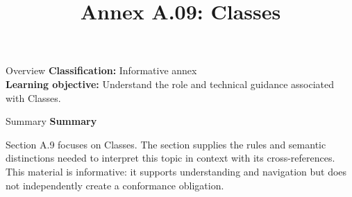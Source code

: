 \documentclass[10pt,letterpaper]{article}
\title{Annex A.09: Classes}
\author{}
\date{}
\begin{document}
\maketitle
\begin{CornellOverviewBox}{Overview}
\textbf{Classification:} Informative annex\\[2pt]
\textbf{Learning objective:} Understand the role and technical guidance associated with Classes.
\end{CornellOverviewBox}\begin{CornellSummaryBox}{Summary}
{\sffamily\bfseries\color{Accent} Summary}\par\vspace{3pt}Section A.9 focuses on Classes. The section supplies the rules and semantic distinctions needed to interpret this topic in context with its cross-references. This material is informative: it supports understanding and navigation but does not independently create a conformance obligation.
\end{CornellSummaryBox}
\end{document}
